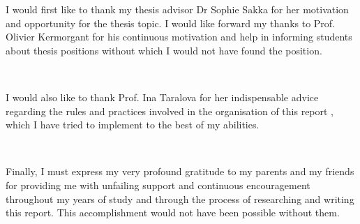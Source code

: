 \documentclass{thesisreport}
\begin{document}
 I would first like to thank my thesis advisor Dr Sophie Sakka for her motivation and opportunity for the thesis topic.
  I would like forward my thanks to Prof. Olivier Kermorgant for his continuous motivation and help in informing 
  students about thesis positions without which I would not have found the position. 

~

I would also like to thank Prof. Ina Taralova for her indispensable advice regarding the rules and practices involved 
in the organisation of this report , which I have tried to implement to the best of my abilities.

~

Finally, I must express my very profound gratitude to my parents and my friends for providing me with unfailing 
support and continuous encouragement throughout my years of study and through the process of researching and writing 
this report. This accomplishment would not have been possible without them.
 \newpage
 
 
\end{document}
